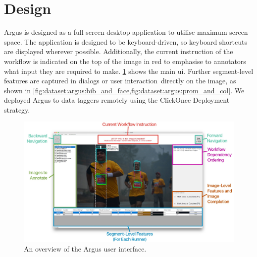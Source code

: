 \section{Design}

Argus is designed as a full-screen desktop application to utilise maximum screen space. The application is designed to be keyboard-driven, so keyboard shortcuts are displayed wherever possible. Additionally, the current instruction of the workflow is indicated on the top of the image in red to emphasise to annotators what input they are required to make. \cref{fig:dataset:argus:overview} shows the main \gls{ui}. Further segment-level features are captured in dialogs or user interaction directly on the image, as shown in \cref{fig:dataset:argus:bib_and_face,fig:dataset:argus:prom_and_col}. We deployed Argus to data taggers remotely using the ClickOnce Deployment strategy.

\begin{figure}[h]
  \centering
  \includegraphics[width=\textwidth]{images/dataset/argus/argus_ui}
  \caption[An overview of the Argus user interface]{An overview of the Argus user interface.}
  \label{fig:dataset:argus:overview}
\end{figure}

